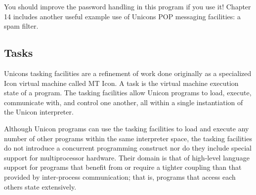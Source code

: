 
You should improve the password handling in this program if you use it!
Chapter 14 includes another useful example use of
Unicon{\textquotesingle}s POP messaging facilities: a spam filter.

\subsection{Tasks}

Unicon{\textquotesingle}s tasking facilities are a refinement of work
done originally as a specialized Icon virtual machine called MT Icon. A
task is the virtual machine execution state of a program. The tasking
facilities allow Unicon programs to load, execute, communicate with,
and control one another, all within a single instantiation of the
Unicon interpreter. 

Although Unicon programs can use the tasking facilities to load and
execute any number of other programs within the same interpreter space,
the tasking facilities do not introduce a concurrent programming
construct nor do they include special support for multiprocessor
hardware. Their domain is that of high-level language support for
programs that benefit from or require a tighter coupling than that
provided by inter-process communication; that is, programs that access
each other{\textquotesingle}s state extensively.

